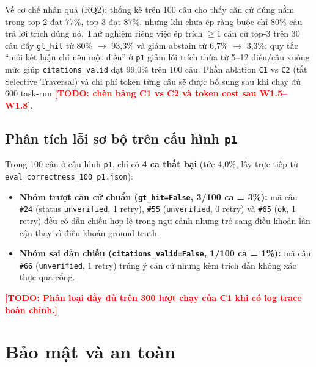 \documentclass[sigconf,nonacm]{acmart}
\newcommand{\TODO}[1]{\textcolor{red}{\textbf{[TODO: #1]}}}
\begin{document}
Về cơ chế nhân quả (RQ2): thống kê trên 100 câu cho thấy căn cứ đúng nằm trong top-2 đạt 77\%, top-3 đạt 87\%, nhưng khi chưa ép ràng buộc chỉ 80\% câu trả lời trích đúng nó. Thử nghiệm riêng việc ép trích $\geq 1$ căn cứ top-3 trên 30 câu đẩy \texttt{gt\_hit} từ 80\% $\to$ 93,3\% và giảm abstain từ 6,7\% $\to$ 3,3\%; quy tắc ``mỗi kết luận chỉ nêu một điều'' ở \texttt{p1} giảm lỗi trích thừa từ 5--12 điều/câu xuống mức giúp \texttt{citations\_valid} đạt 99,0\% trên 100 câu. Phần ablation \texttt{C1} vs \texttt{C2} (tắt Selective Traversal) và chi phí token từng câu sẽ được bổ sung sau khi chạy đủ 600 task-run \TODO{chèn bảng C1 vs C2 và token cost sau W1.5--W1.8}.

\subsection{Phân tích lỗi sơ bộ trên cấu hình \texttt{p1}}
Trong 100 câu ở cấu hình \texttt{p1}, chỉ có \textbf{4 ca thất bại} (tức 4,0\%, lấy trực tiếp từ \texttt{eval\_correctness\_100\_p1.json}):
\begin{itemize}[leftmargin=*]
  \item \textbf{Nhóm trượt căn cứ chuẩn (\texttt{gt\_hit=False}, 3/100 ca = 3\%):} mã câu \texttt{\#24} (status \texttt{unverified}, 1 retry), \texttt{\#55} (\texttt{unverified}, 0 retry) và \texttt{\#65} (\texttt{ok}, 1 retry) đều có dẫn chiếu hợp lệ trong ngữ cảnh nhưng trỏ sang điều khoản lân cận thay vì điều khoản ground truth.
  \item \textbf{Nhóm sai dẫn chiếu (\texttt{citations\_valid=False}, 1/100 ca = 1\%):} mã câu \texttt{\#66} (\texttt{unverified}, 1 retry) trúng ý căn cứ nhưng kèm trích dẫn không xác thực qua cổng.
\end{itemize}
\TODO{Phân loại đầy đủ trên 300 lượt chạy của C1 khi có log trace hoàn chỉnh.}

\section{Bảo mật và an toàn}
\label{sec:security}
\end{document}
